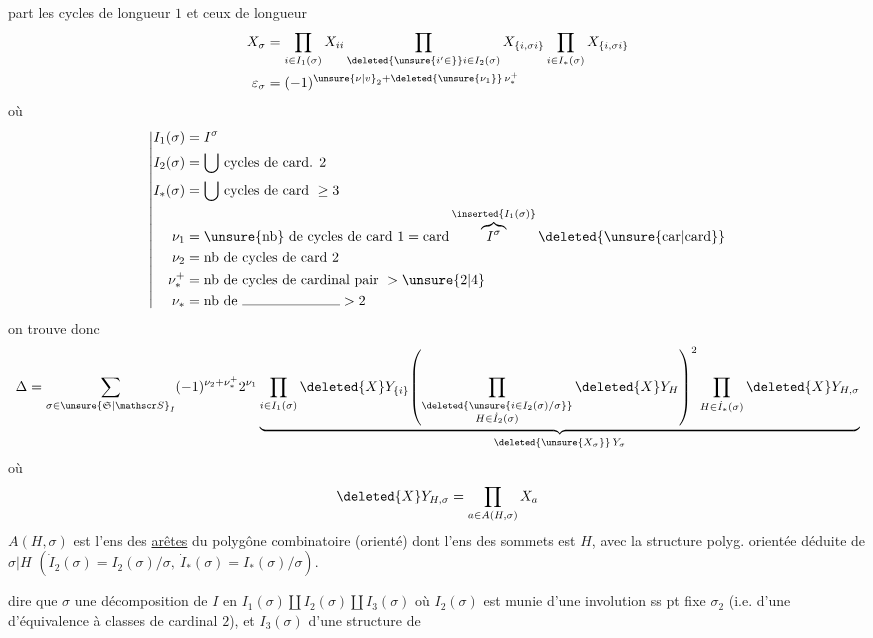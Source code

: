 part les cycles de longueur $1$ et ceux de longueur 
\[
\begin{aligned}
X_\sigma&=\prod_{i\in I_1(\sigma)}X_{ii}
\prod_{\deleted{\unsure{i'\in}}i\in I_2(\sigma)} X_{\{i,\sigma i\}}
\prod_{i\in I_*(\sigma)}X_{\{i,\sigma i\}}\\
\varepsilon_\sigma&=(-1)^{\unsure{\nu|v}_2+\deleted{\unsure{\nu_1}}\,\nu_*^+}
\end{aligned}
\]
où
\[
\left|\begin{aligned}
I_1(\sigma)&=I^\sigma\\
I_2(\sigma)&=\bigcup\,\text{cycles de card. }2\\
I_*(\sigma)&=\bigcup\,\text{cycles de card }\geq3\\
\nu_1&=\unsure{\text{nb}}\ \text{de cycles de card }1=\operatorname{card}\overbrace{I^\sigma}^{\inserted{I_1(\sigma)}}\deleted{\unsure{\mathrm{car}|\mathrm{card}}}\\
\nu_2&=\text{nb de cycles de card }2\\
\nu_*^+&=\text{nb de cycles de cardinal pair } >\unsure{2|4}\\
\nu_*&=\text{nb de }\rule{7em}{0.35pt}>2
\end{aligned}\right.
\]
on trouve donc
\[
\Delta=\sum_{\sigma\in\unsure{\mathfrak S|\mathscr S}_I}(-1)^{\nu_2+\nu_*^+}2^{\nu_1}
\underbrace{\prod_{i\in I_1(\sigma)}\deleted{X}Y_{\{i\}}\!
\left(\prod_{\substack{\deleted{\unsure{i\in I_2(\sigma)/\sigma}}\\H\in\dot I_2(\sigma)}}\deleted{X}Y_H\right)^{2}
\prod_{H\in\dot I_*(\sigma)}\deleted{X}Y_{H,\sigma}}_{\deleted{\unsure{X_\sigma}}\,Y_\sigma}
\]
où
\[
\deleted{X}Y_{H,\sigma}=\prod_{a\in A(H,\sigma)}X_a
\]
$A(H,\sigma)$ est l'ens des \uline{arêtes} du polygône combinatoire (orienté) dont l'ens des sommets est $H$, avec la structure polyg. orientée déduite de $\sigma|H$ \enspace $(\dot I_2(\sigma)=I_2(\sigma)/\sigma,\ \dot I_*(\sigma)=I_*(\sigma)/\sigma)$.

  dire que  $\sigma$   une  décomposition de $I$ en $I_1(\sigma)\amalg I_2(\sigma)\amalg I_3(\sigma)$ où $I_2(\sigma)$ est munie d'une involution ss pt fixe $\sigma_2$ (i.e. d'une   d'équivalence à classes de cardinal $2$),  et $I_3(\sigma)$ d'une structure de
